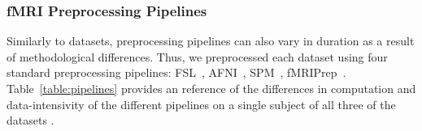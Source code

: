     \begin{table}[t]
      \small\centering
    \caption{Dataset characteristics}\label{table:data}
    \end{table}
    
    
    
    \subsubsection{fMRI Preprocessing Pipelines}
    
    Similarly to datasets, preprocessing pipelines can also vary in duration as a result of methodological differences.
    Thus, we preprocessed each dataset using four standard preprocessing pipelines: FSL~\cite{fsl}, AFNI~\cite{AFNI},
    SPM~\cite{spm}, fMRIPrep~\cite{fmriprep}. Table~\ref{table:pipelines} provides an reference of the differences in computation and data-intensivity
    of the different pipelines on a single subject of all three of the datasets .
    
